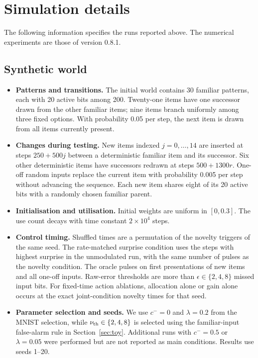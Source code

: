 \documentclass[11pt,a4paper]{article}
\begin{document}
\section{Simulation details}\label{app:methods}
The following information specifies the runs reported above. The numerical experiments are those of version 0.8.1.

\subsection{Synthetic world}
\begin{itemize}
\item \textbf{Patterns and transitions.} The initial world contains 30 familiar patterns, each with 20 active bits among 200. Twenty-one items have one successor drawn from the other familiar items; nine items branch uniformly among three fixed options. With probability 0.05 per step, the next item is drawn from all items currently present.
\item \textbf{Changes during testing.} New items indexed $j=0,\dots,14$ are inserted at steps $250+500j$ between a deterministic familiar item and its successor. Six other deterministic items have successors redrawn at steps $500+1300r$. One-off random inputs replace the current item with probability 0.005 per step without advancing the sequence. Each new item shares eight of its 20 active bits with a randomly chosen familiar parent.
\item \textbf{Initialisation and utilisation.} Initial weights are uniform in $[0,0.3]$. The use count decays with time constant $2\times10^4$ steps.
\item \textbf{Control timing.} Shuffled times are a permutation of the novelty triggers of the same seed. The rate-matched surprise condition uses the steps with highest surprise in the unmodulated run, with the same number of pulses as the novelty condition. The oracle pulses on first presentations of new items and all one-off inputs. Raw-error thresholds are more than $\epsilon\in\{2,4,8\}$ missed input bits. For fixed-time action ablations, allocation alone or gain alone occurs at the exact joint-condition novelty times for that seed.
\item \textbf{Parameter selection and seeds.} We use $c^-=0$ and $\lambda=0.2$ from the MNIST selection, while $\nu_{\rm th}\in\{2,4,8\}$ is selected using the familiar-input false-alarm rule in Section~\ref{sec:toy}. Additional runs with $c^-=0.5$ or $\lambda=0.05$ were performed but are not reported as main conditions. Results use seeds 1--20.
\end{itemize}
\end{document}
